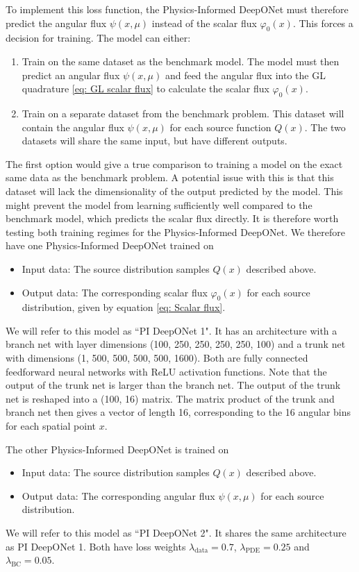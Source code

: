 \documentclass[%
 reprint,
 amsmath,amssymb,
 aps,
]{revtex4-1}
\begin{document}
To implement this loss function, the Physics-Informed DeepONet must therefore predict the angular flux $\psi(x,\mu)$ instead of the scalar flux $\varphi_0(x)$.
This forces a decision for training. The model can either:
\begin{enumerate}
    \item Train on the same dataset as the benchmark model. The model must then predict an angular flux $\psi(x,\mu)$ and feed the angular flux into
    the GL quadrature \eqref{eq: GL scalar flux} to calculate the scalar flux $\varphi_0(x)$.
    \item Train on a separate dataset from the benchmark problem. This dataset will contain the angular flux $\psi(x,\mu)$ for each source
    function $Q(x)$. The two datasets will share the same input, but have different outputs.
\end{enumerate}

The first option would give a true comparison to training a model on the exact same data as the benchmark problem. A potential issue with this
is that this dataset will lack the dimensionality of the output predicted by the model. This might prevent the model from learning sufficiently
well compared to the benchmark model, which predicts the scalar flux directly. It is therefore worth testing both training regimes for the
Physics-Informed DeepONet. We therefore have one Physics-Informed DeepONet trained on
\begin{itemize}
    \item Input data: The source distribution samples $Q(x)$ described above.
    \item Output data: The corresponding scalar flux $\varphi_0(x)$ for each source distribution, given by equation \eqref{eq: Scalar flux}.
\end{itemize}
We will refer to this model as “PI DeepONet 1". It has an architecture with a branch net with layer dimensions
(100, 250, 250, 250, 250, 100) and a trunk net with dimensions (1, 500, 500, 500, 500, 1600). Both are fully connected feedforward
neural networks with ReLU activation functions.
Note that the output of the trunk net is larger than the branch net. The output of the trunk net is reshaped into a (100, 16) matrix. The matrix
product of the trunk and branch net then gives a vector of length 16, corresponding to the 16 angular bins for each spatial point $x$.

The other Physics-Informed DeepONet is trained on
\begin{itemize}
    \item Input data: The source distribution samples $Q(x)$ described above.
    \item Output data: The corresponding angular flux $\psi(x, \mu)$ for each source distribution.
\end{itemize}
We will refer to this model as “PI DeepONet 2". It shares the same architecture as PI DeepONet 1. Both have loss weights $\lambda_\text{data} = 0.7$,
$\lambda_\text{PDE} = 0.25$ and $\lambda_\text{BC} = 0.05$.
\end{document}

